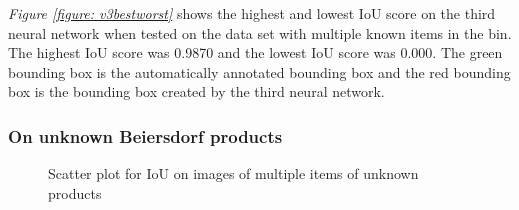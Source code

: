 \textit{Figure \ref{figure: v3bestworst}} shows the highest and lowest IoU score on the third neural network when tested on the data set with multiple known items in the bin. The highest IoU score was 0.9870 and the lowest IoU score was 0.000. The green bounding box is the automatically annotated bounding box and the red bounding box is the bounding box created by the third neural network.



\clearpage
\subsubsection{On unknown Beiersdorf products}\label{subsec:v3resunknownprod}

\begin{figure}[h]
 \centering
 \hfill
 \caption{Scatter plot for IoU on images of multiple items of unknown products}
 \label{figure: v3unknownproducts}
\end{figure}

